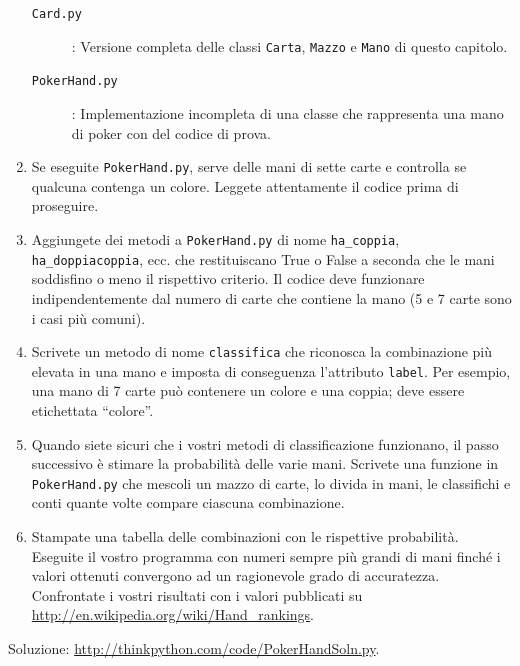 \documentclass[10pt]{book}
\begin{document}
\begin{exercise}
\begin{enumerate}
\begin{description}

\item[{\tt Card.py}]: Versione completa delle classi {\tt Carta},
{\tt Mazzo} e {\tt Mano} di questo capitolo.

\item[{\tt PokerHand.py}]: Implementazione incompleta di una classe che rappresenta una mano di poker con del codice di prova.


\end{description}
%
\item Se eseguite {\tt PokerHand.py}, serve delle mani di sette carte e controlla se qualcuna contenga un colore. Leggete attentamente il codice prima di proseguire.

\item Aggiungete dei metodi a {\tt PokerHand.py} di nome \verb"ha_coppia",
\verb"ha_doppiacoppia", ecc. che restituiscano True o False a seconda che le mani soddisfino o meno il rispettivo criterio. Il codice deve funzionare indipendentemente dal numero di carte che contiene la mano (5 e 7 carte sono i casi più comuni).

\item Scrivete un metodo di nome {\tt classifica} che riconosca la combinazione più elevata in una mano e imposta di conseguenza l'attributo
{\tt label}.  Per esempio, una mano di 7 carte può contenere un colore e una coppia; deve essere etichettata ``colore''.

\item Quando siete sicuri che i vostri metodi di classificazione funzionano, il passo successivo è stimare la probabilità delle varie mani. Scrivete una funzione in {\tt PokerHand.py} che mescoli un mazzo di carte, lo divida in mani, le classifichi e conti quante volte compare ciascuna combinazione.

\item Stampate una tabella delle combinazioni con le rispettive probabilità. Eseguite il vostro programma con numeri sempre più grandi di mani finché i valori ottenuti convergono ad un ragionevole grado di accuratezza. Confrontate i vostri risultati con i valori pubblicati su \url{http://en.wikipedia.org/wiki/Hand_rankings}.

\end{enumerate}

Soluzione: \url{http://thinkpython.com/code/PokerHandSoln.py}.
\end{exercise}
\end{document}
